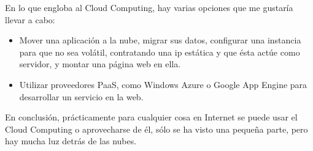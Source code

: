 \documentclass[runningheads]{llncs}
\begin{document}
En lo que engloba al Cloud Computing, hay varias opciones que me gustaría llevar a cabo:

\begin{itemize}
 \item Mover una aplicación a la nube, migrar sus datos, configurar una  instancia para que no sea volátil, contratando una ip estática  y que 
 ésta actúe como servidor, y montar una página web en ella. 
 \item Utilizar proveedores PaaS, como Windows Azure o Google App Engine para desarrollar un servicio en la web. 
\end{itemize}


En conclusión, prácticamente para cualquier cosa en Internet se puede usar el Cloud Computing o aprovecharse de él, sólo se ha visto 
una pequeña parte, pero hay mucha luz detrás de las nubes.




\end{document}
